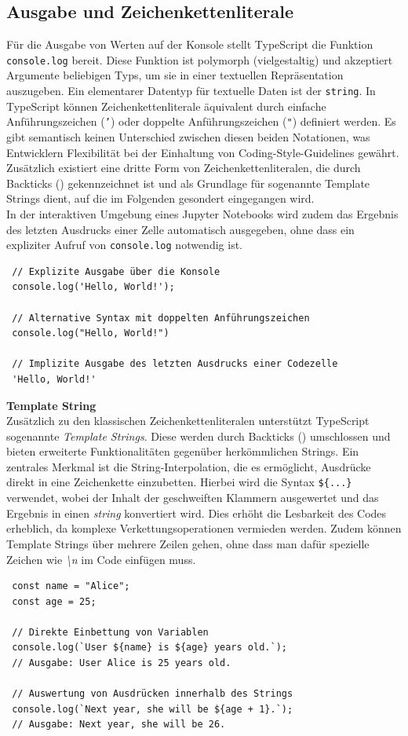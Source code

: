 \subsection{Ausgabe und Zeichenkettenliterale}
Für die Ausgabe von Werten auf der Konsole stellt TypeScript die Funktion \texttt{console.log} bereit. Diese Funktion ist polymorph (vielgestaltig) und akzeptiert Argumente beliebigen Typs, um sie in einer textuellen Repräsentation auszugeben. Ein elementarer Datentyp für textuelle Daten ist der \texttt{string}. In TypeScript können Zeichenkettenliterale äquivalent durch einfache Anführungszeichen (\texttt{'}) oder doppelte Anführungszeichen (\texttt{"}) definiert werden. Es gibt semantisch keinen Unterschied zwischen diesen beiden Notationen, was Entwicklern Flexibilität bei der Einhaltung von Coding-Style-Guidelines gewährt. Zusätzlich existiert eine dritte Form von Zeichenkettenliteralen, die durch Backticks (\texttt{\textasciigrave}) gekennzeichnet ist und als Grundlage für sogenannte Template Strings dient, auf die im Folgenden gesondert eingegangen wird.\\
In der interaktiven Umgebung eines Jupyter Notebooks wird zudem das Ergebnis des letzten Ausdrucks einer Zelle automatisch ausgegeben, ohne dass ein expliziter Aufruf von \texttt{console.log} notwendig ist.
\begin{verbatim}
 // Explizite Ausgabe über die Konsole
 console.log('Hello, World!');
 
 // Alternative Syntax mit doppelten Anführungszeichen
 console.log("Hello, World!")
	
 // Implizite Ausgabe des letzten Ausdrucks einer Codezelle
 'Hello, World!'
\end{verbatim}

\textbf{Template String}\\
Zusätzlich zu den klassischen Zeichenkettenliteralen unterstützt TypeScript sogenannte \textit{Template Strings}. Diese werden durch Backticks (\texttt{\textasciigrave}) umschlossen und bieten erweiterte Funktionalitäten gegenüber herkömmlichen Strings. Ein zentrales Merkmal ist die String-Interpolation, die es ermöglicht, Ausdrücke direkt in eine Zeichenkette einzubetten. Hierbei wird die Syntax \texttt{\$\{...\}} verwendet, wobei der Inhalt der geschweiften Klammern ausgewertet und das Ergebnis in einen \emph{string} konvertiert wird. Dies erhöht die Lesbarkeit des Codes erheblich, da komplexe Verkettungsoperationen vermieden werden. Zudem können Template Strings über mehrere Zeilen gehen, ohne dass man dafür spezielle Zeichen wie \emph{\textbackslash n} im Code einfügen muss.
\begin{verbatim}
 const name = "Alice";
 const age = 25;
 
 // Direkte Einbettung von Variablen
 console.log(`User ${name} is ${age} years old.`);
 // Ausgabe: User Alice is 25 years old.
	
 // Auswertung von Ausdrücken innerhalb des Strings
 console.log(`Next year, she will be ${age + 1}.`);
 // Ausgabe: Next year, she will be 26.
\end{verbatim}

